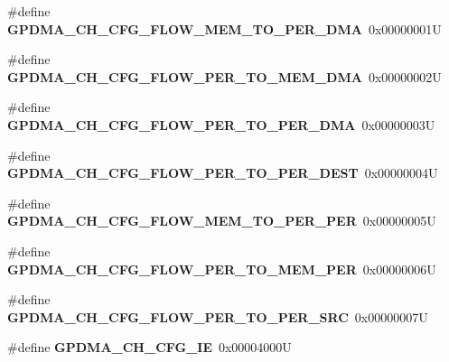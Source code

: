 \begin{DoxyCompactItemize}
\#define {\bfseries G\+P\+D\+M\+A\+\_\+\+C\+H\+\_\+\+C\+F\+G\+\_\+\+F\+L\+O\+W\+\_\+\+M\+E\+M\+\_\+\+T\+O\+\_\+\+P\+E\+R\+\_\+\+D\+MA}~0x00000001U
\item 
\mbox{\label{group__lpc24xx__regs_gae09ef8f6ef25d33285f45a8a80131976}} 
\#define {\bfseries G\+P\+D\+M\+A\+\_\+\+C\+H\+\_\+\+C\+F\+G\+\_\+\+F\+L\+O\+W\+\_\+\+P\+E\+R\+\_\+\+T\+O\+\_\+\+M\+E\+M\+\_\+\+D\+MA}~0x00000002U
\item 
\mbox{\label{group__lpc24xx__regs_ga8a6142068d1da103708b4f0a2ba24f84}} 
\#define {\bfseries G\+P\+D\+M\+A\+\_\+\+C\+H\+\_\+\+C\+F\+G\+\_\+\+F\+L\+O\+W\+\_\+\+P\+E\+R\+\_\+\+T\+O\+\_\+\+P\+E\+R\+\_\+\+D\+MA}~0x00000003U
\item 
\mbox{\label{group__lpc24xx__regs_gac6cb55116ad6438f5ff36f4cae71d681}} 
\#define {\bfseries G\+P\+D\+M\+A\+\_\+\+C\+H\+\_\+\+C\+F\+G\+\_\+\+F\+L\+O\+W\+\_\+\+P\+E\+R\+\_\+\+T\+O\+\_\+\+P\+E\+R\+\_\+\+D\+E\+ST}~0x00000004U
\item 
\mbox{\label{group__lpc24xx__regs_gab742179232a2e47b643ee151de234305}} 
\#define {\bfseries G\+P\+D\+M\+A\+\_\+\+C\+H\+\_\+\+C\+F\+G\+\_\+\+F\+L\+O\+W\+\_\+\+M\+E\+M\+\_\+\+T\+O\+\_\+\+P\+E\+R\+\_\+\+P\+ER}~0x00000005U
\item 
\mbox{\label{group__lpc24xx__regs_gab2278deed2d68ac2c6b96abd27cbb46b}} 
\#define {\bfseries G\+P\+D\+M\+A\+\_\+\+C\+H\+\_\+\+C\+F\+G\+\_\+\+F\+L\+O\+W\+\_\+\+P\+E\+R\+\_\+\+T\+O\+\_\+\+M\+E\+M\+\_\+\+P\+ER}~0x00000006U
\item 
\mbox{\label{group__lpc24xx__regs_ga9a456c9606dd9f496fb23a8d7b7c23ac}} 
\#define {\bfseries G\+P\+D\+M\+A\+\_\+\+C\+H\+\_\+\+C\+F\+G\+\_\+\+F\+L\+O\+W\+\_\+\+P\+E\+R\+\_\+\+T\+O\+\_\+\+P\+E\+R\+\_\+\+S\+RC}~0x00000007U
\item 
\mbox{\label{group__lpc24xx__regs_ga0d82c64ec5d391bbb06cd2ba7f26c04d}} 
\#define {\bfseries G\+P\+D\+M\+A\+\_\+\+C\+H\+\_\+\+C\+F\+G\+\_\+\+IE}~0x00004000U
\item 
\mbox{\label{group__lpc24xx__regs_ga06bc49704d0c94f1211dd86a641c314e}} 

\end{DoxyCompactItemize}
